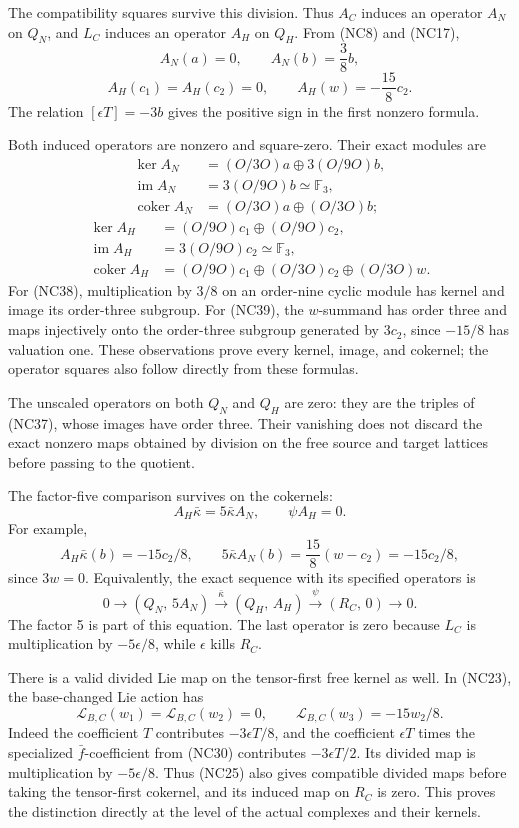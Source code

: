 \documentclass[
  10pt,
]{article}
\begin{document}
The compatibility squares survive this division. Thus \(A_C\) induces an
operator \(A_N\) on \(Q_N\), and \(L_C\) induces an operator \(A_H\) on
\(Q_H\). From (NC8) and (NC17), \[
A_N(a)=0,\qquad A_N(b)=\frac38b,
\] \[
A_H(c_1)=A_H(c_2)=0,\qquad
A_H(w)=-\frac{15}{8}c_2.
\tag{NC37}
\] The relation \([\epsilon T]=-3b\) gives the positive sign in the
first nonzero formula.

Both induced operators are nonzero and square-zero. Their exact modules
are \[
\begin{aligned}
\ker A_N&=(O/3O)a\oplus3(O/9O)b,\\
\operatorname{im}A_N&=3(O/9O)b\simeq\mathbb F_3,\\
\operatorname{coker}A_N&=(O/3O)a\oplus(O/3O)b;
\end{aligned}
\tag{NC38}
\] \[
\begin{aligned}
\ker A_H&=(O/9O)c_1\oplus(O/9O)c_2,\\
\operatorname{im}A_H&=3(O/9O)c_2\simeq\mathbb F_3,\\
\operatorname{coker}A_H&=(O/9O)c_1
\oplus(O/3O)c_2\oplus(O/3O)w.
\end{aligned}
\tag{NC39}
\] For (NC38), multiplication by \(3/8\) on an order-nine cyclic module
has kernel and image its order-three subgroup. For (NC39), the
\(w\)-summand has order three and maps injectively onto the order-three
subgroup generated by \(3c_2\), since \(-15/8\) has valuation one. These
observations prove every kernel, image, and cokernel; the operator
squares also follow directly from these formulas.

The unscaled operators on both \(Q_N\) and \(Q_H\) are zero: they are
the triples of (NC37), whose images have order three. Their vanishing
does not discard the exact nonzero maps obtained by division on the free
source and target lattices before passing to the quotient.

The factor-five comparison survives on the cokernels: \[
A_H\bar\kappa=5\bar\kappa A_N,\qquad \psi A_H=0.
\tag{NC40}
\] For example, \[
A_H\bar\kappa(b)=-15c_2/8,\qquad
5\bar\kappa A_N(b)=\frac{15}{8}(w-c_2)=-15c_2/8,
\] since \(3w=0\). Equivalently, the exact sequence with its specified
operators is \[
0\longrightarrow(Q_N,\,5A_N)
\xrightarrow{\bar\kappa}(Q_H,\,A_H)
\xrightarrow{\psi}(R_C,\,0)
\longrightarrow0.
\tag{NC41}
\] The factor 5 is part of this equation. The last operator is zero
because \(L_C\) is multiplication by \(-5\epsilon/8\), while
\(\epsilon\) kills \(R_C\).

There is a valid divided Lie map on the tensor-first free kernel as
well. In (NC23), the base-changed Lie action has \[
\mathcal L_{B,C}(w_1)=\mathcal L_{B,C}(w_2)=0,\qquad
\mathcal L_{B,C}(w_3)=-15w_2/8.
\tag{NC42}
\] Indeed the coefficient \(T\) contributes \(-3\epsilon T/8\), and the
coefficient \(\epsilon T\) times the specialized \(\bar f\)-coefficient
from (NC30) contributes \(-3\epsilon T/2\). Its divided map is
multiplication by \(-5\epsilon/8\). Thus (NC25) also gives compatible
divided maps before taking the tensor-first cokernel, and its induced
map on \(R_C\) is zero. This proves the distinction directly at the
level of the actual complexes and their kernels.
\end{document}
